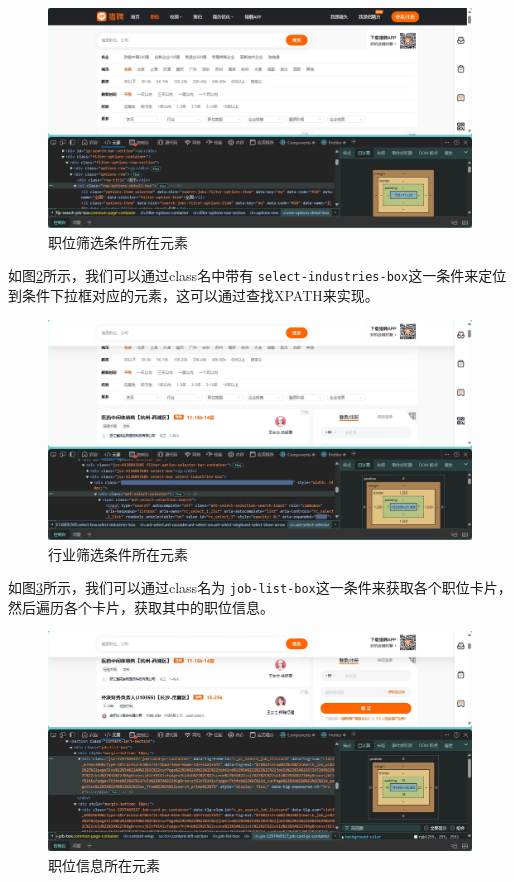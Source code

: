 \begin{figure}[!htbp]
    \centering
    \includegraphics[width=\textwidth]{figures/options.png}
    \caption{职位筛选条件所在元素}\label{options}
\end{figure}

如图\ref{selector}所示，我们可以通过class名中带有 \texttt{select-industries-box}这一条件来定位到条件下拉框对应的元素，这可以通过查找XPATH来实现。

\begin{figure}[!htbp]
    \centering
    \includegraphics[width=\textwidth]{figures/selector.png}
    \caption{行业筛选条件所在元素}\label{selector}
\end{figure}

如图\ref{card}所示，我们可以通过class名为 \texttt{job-list-box}这一条件来获取各个职位卡片，然后遍历各个卡片，获取其中的职位信息。

\begin{figure}[!htbp]
    \centering
    \includegraphics[width=\textwidth]{figures/card.png}
    \caption{职位信息所在元素}\label{card}
\end{figure}

